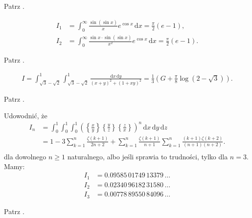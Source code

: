 \begin{solution}
    Patrz \cite[s. ?????]{valean19}.
\end{solution}


\begin{problem_with_solution}
    \label{valean_1_41}%
    \begin{align}
        I_1 & = \int_0^\infty \frac{\sin (\sin x)}{x} e^{\cos x} \,\mathrm{d} x = \frac{\pi} 2 (e - 1), \\
        I_2 & = \int_0^\infty \frac{\sin x \cdot \sin (\sin x)}{x^2} e^{\cos x} \,\mathrm{d} x = \frac{\pi} 2 (e - 1).
    \end{align} 
\end{problem_with_solution}

\begin{solution}
    Patrz \cite[s. ?????]{valean19}.
\end{solution}

\begin{problem_with_solution}
    \label{valean_1_44}%
    \begin{align}
        I = \int_{\sqrt{3} - \sqrt{2}}^1 \int_{\sqrt{3} - \sqrt{2}}^1 \frac{\mathrm{d}x \,\mathrm{d}y}{(x+y)^2 + (1+xy)^2} = \frac 1 3 \left(G + \frac \pi 8 \log (2 - \sqrt3)\right).
    \end{align} 
\end{problem_with_solution}

\begin{solution}
    Patrz \cite[s. ?????]{valean19}.
\end{solution}

\begin{problem_with_solution}
    \label{valean_1_48}%
    Udowodnić, że 
    \begin{align}
        I_n & = \int_0^1 \int_0^1 \int_0^1 \left( \left\{\frac x y \right\} \left\{\frac yz\right\} \left\{\frac zx \right\} \right)^n \,\mathrm{d}x\,\mathrm{d}y\,\mathrm{d}z \\
        & = 1 - 3 \sum_{k=1}^n \frac{\zeta(k+1)}{2n+2}  + \sum_{k=1}^n \frac{\zeta(k+1)}{n+1} \sum_{k=1}^n \frac{(k+1) \zeta(k+2)}{(n+1)(n+2)} . \\
    \end{align} 
    dla dowolnego $n \ge 1$ naturalnego, albo jeśli sprawia to trudności, tylko dla $n = 3$.
    Mamy:
    \begin{align}
        I_1 & = 0.09585\,01749\,13379\,\ldots \\
        I_2 & = 0.02340\,96182\,31580\,\ldots \\
        I_3 & = 0.00778\,89550\,84096\,\ldots %
    \end{align}
\end{problem_with_solution}

\begin{solution}
    Patrz \cite[s. ?????]{valean19}.
\end{solution}

%